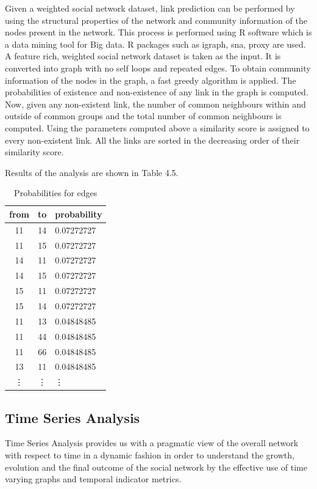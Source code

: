 
Given a weighted social network dataset, link prediction can be performed by using the structural properties
of the network and community information of the nodes present in the network. This process is performed using
R software which is a data mining tool for Big data. R packages such as igraph, sna, proxy are used. A feature
rich, weighted social network dataset is taken as the input. It is converted into graph with no self loops and
repeated edges. To obtain community information of the nodes in the graph, a fast greedy algorithm is applied.
The probabilities of existence and non-existence of any link in the graph is computed. Now, given any non-existent link,
the number of common neighbours within and outside of common groups and the total number of common neighbours is computed.
Using the parameters computed above a similarity score is assigned to every non-existent link. All the links are sorted
in the decreasing order of their similarity score.


Results of the analysis are shown in Table 4.5.

\begin{table}[htb]
\centering
\begin{tabular}{ccl}\hline
from & to & probability\\ \hline
11 & 14 & 0.07272727\\
11 & 15 & 0.07272727\\
14 & 11 & 0.07272727\\
14 & 15 & 0.07272727\\
15 & 11 & 0.07272727\\
15 & 14 & 0.07272727\\
11 & 13 & 0.04848485\\
11 & 44 & 0.04848485\\
11 & 66 & 0.04848485\\
13 & 11 & 0.04848485\\
\vdots&\vdots&\vdots\\ \hline
\end{tabular}\label{Table2}
\caption{Probabilities for edges}
\end{table}


\subsection{Time Series Analysis}

Time Series Analysis provides us with a pragmatic view of the overall network with respect to time in a
dynamic fashion in order to understand the growth, evolution and the final outcome of the social network
by the effective use of time varying graphs and temporal indicator metrics.

